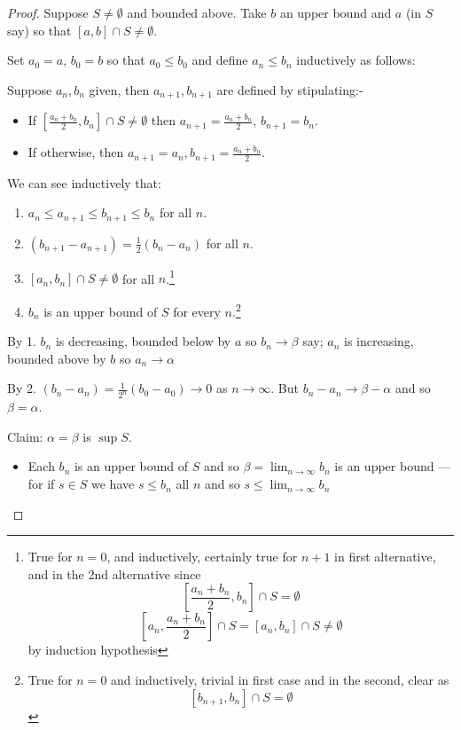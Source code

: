 \documentclass{notes}
\theoremstyle{plain}
\begin{document}
\begin{proof}
Suppose $ S \neq \emptyset $ and bounded above. Take $ b $ an 
upper bound and $ a $ (in $ S $ say) so that $[a,b] \cap S 
\neq \emptyset$.

Set $a_{0}=a$, $b_{0}=b$ so that $a_{0} \leq b_{0}$ and define 
$ a_{n}\leq b_{n} $ inductively as follows:

Suppose $ a_{n}, b_{n} $ given, then $ a_{n+1}, b_{n+1} $ are 
defined by stipulating:-
\begin{itemize}
\item If $ \left[ \frac{a_{n}+b_{n}}{2}, b_{n} \right] \cap S \neq 
\emptyset  $ then $a_{n+1}= \frac{a_{n}+b_{n}}{2}$, $b_{n+1}=b_{n}$.
\item If otherwise, then $a_{n+1}=a_{n}, b_{n+1}= 
\frac{a_{n}+b_{n}}{2}$.
\end{itemize}

We can see inductively that:
\begin{enumerate}
\item $a_{n}\leq a_{n+1} \leq b_{n+1} \leq b_{n}$ for all $ n $.
\item $(b_{n+1}-a_{n+1}) = \frac{1}{2}(b_{n}-a_{n})$ for all $n$.
\item $[a_{n},b_{n}] \cap S \neq \emptyset$
for all $ n $.\footnote{True for $ n=0 $, and inductively, certainly true for
$ n+1 $ 
in first alternative, and in the 2nd alternative since \[ 
\left[\frac{a_{n}+b_{n}}{2}, b_{n}\right] \cap S = \emptyset\] \[ \left[a_{n}, 
\frac{a_{n}+b_{n}}{2}\right] \cap S = [a_{n}, b_{n}] \cap S \neq \emptyset 
\] by induction hypothesis}

\item $ b_{n} $ is an upper bound of $ S $ for every $ n $.\footnote{
True for $ n=0$ and inductively, trivial in first case and in the 
second, clear as \[ [b_{n+1}, b_{n}] \cap S = \emptyset \]}
\end{enumerate}

By 1. $ b_{n} $ is decreasing, bounded below by $ a $ so $ b_{n}\to \beta$ say; $ a_{n} $ is increasing, bounded 
above by $ b $ so $a_{n}\to \alpha$

By 2. $(b_{n}-a_{n}) = \frac{1}{2^{n}}(b_{0}-a_{0}) \to 0$ 
as $ n \to \infty $. But $b_{n} -a_{n} \to 
\beta - \alpha$ and so $ \beta = \alpha $.

Claim: $ \alpha = \beta $ is $ \sup S $.

\begin{itemize}
\item Each $ b_{n}  $ is an upper bound of $ S $ and so $\beta = 
\lim_{n \to \infty}b_{n}$ is an upper bound --- for if $ s 
\in S $ we have $ s \leq b_{n} $ all $ n $ and so $s \leq 
\lim_{n \to \infty}b_{n}$


\end{itemize}
\end{proof}
\end{document}
